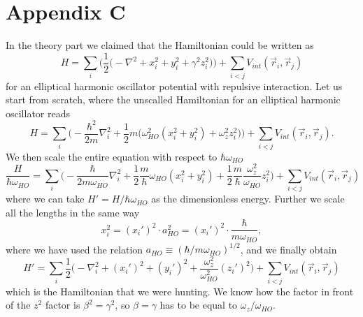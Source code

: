 \documentclass[norsk,a4paper,12pt]{article}
\begin{document}
\section*{Appendix C} \label{sec:appendix_c}
In the theory part we claimed that the Hamiltonian could be written as
\begin{equation}
H=\sum_i\bigg(\frac{1}{2}\Big(-\nabla^2 + x_i^2 + y_i^2 + \gamma^2z_i^2\Big)\bigg)+\sum_{i<j}V_{int}(\vec{r}_i,\vec{r}_j)
\end{equation}
for an elliptical harmonic oscillator potential with repulsive interaction. Let us start from scratch, where the unscalled Hamiltonian for an elliptical harmonic oscillator reads
\begin{equation*}
H=\sum_i\bigg(-\frac{\hbar^2}{2m}\nabla_i^2+\frac{1}{2}m\Big(\omega_{HO}^2(x_i^2+y_i^2)+\omega_z^2z_i^2\Big)\bigg)+\sum_{i<j}V_{int}(\vec{r}_i, \vec{r}_j).
\end{equation*}
We then scale the entire equation with respect to $\hbar\omega_{HO}$
\begin{equation*}
\frac{H}{\hbar\omega_{HO}}=\sum_i\bigg(-\frac{\hbar}{2m\omega_{HO}}\nabla_i^2+\frac{1}{2}\frac{m}{\hbar}\omega_{HO}(x_i^2+y_i^2)+\frac{1}{2}\frac{m}{\hbar}\frac{\omega_z^2}{\omega_{HO}}z_i^2\bigg)+\sum_{i<j}V_{int}(\vec{r}_i, \vec{r}_j)
\end{equation*}
where we can take $H'=H/\hbar\omega_{HO}$ as the dimensionless energy. Further we scale all the lengths in the same way
\begin{equation*}
x_i^2=(x_i')^2\cdot a_{HO}^2=(x_i')^2\cdot\frac{\hbar}{m\omega_{HO}},
\end{equation*}
where we have used the relation $a_{HO}\equiv (\hbar/m\omega_{HO})^{1/2}$, and we finally obtain
\begin{equation}
H'=\sum_i\frac{1}{2}\bigg(-\nabla_i^2+(x_i')^2+(y_i')^2+\frac{\omega_z^2}{\omega_{HO}^2}(z_i')^2\bigg)+\sum_{i<j}V_{int}(\vec{r}_i, \vec{r}_j)
\end{equation}
which is the Hamiltonian that we were hunting. We know how the factor in front of the $z^2$ factor is $\beta^2 = \gamma^2$, so $\beta = \gamma$ has to be equal to $\omega_z/\omega_{HO}$.
\end{document}
